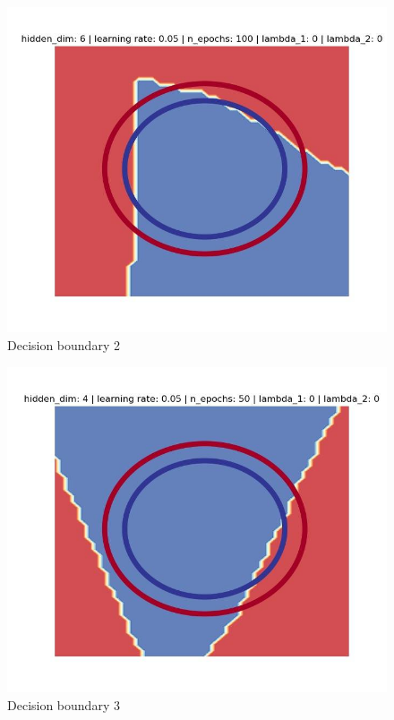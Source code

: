 \documentclass[11pt,english]{article}
\begin{document}
\begin{figure}
	\includegraphics[width=\linewidth]{decision2.jpg}
	\caption{Decision boundary 2}
	\label{fig:boat1}
\end{figure}

\begin{figure}
	\includegraphics[width=\linewidth]{decision3.jpg}
	\caption{Decision boundary 3}
	\label{fig:boat1}
\end{figure}
\end{document}
